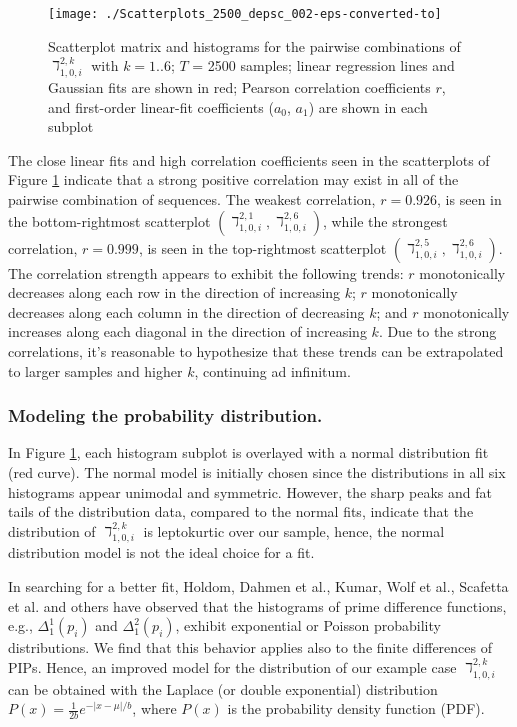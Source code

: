 \documentclass[12pt,longtitle,times]{amsart}
\begin{document}
\begin{figure}[hp]
\centering
\texttt{[image: ./Scatterplots\_2500\_depsc\_002-eps-converted-to]}
\caption{Scatterplot matrix and histograms for the pairwise combinations of $\daleth_{1,0,i}^{2,k}$ with $k=1..6$; $T$ = 2500 samples; linear regression lines and Gaussian fits are shown in red; Pearson correlation coefficients $r$, and first-order linear-fit coefficients ($a_0$, $a_1$) are shown in each subplot}
\label{fig:Scatterplots_BIG_dtiff_001}
\end{figure}

The close linear fits and high correlation coefficients seen in the scatterplots of Figure \ref{fig:Scatterplots_BIG_dtiff_001} indicate that a strong positive correlation may exist in all of the pairwise combination of sequences. The weakest correlation, $r = 0.926$, is seen in the bottom-rightmost scatterplot $(\daleth_{1,0,i}^{2,1},\daleth_{1,0,i}^{2,6})$, while the strongest correlation, $r = 0.999$, is seen in the top-rightmost scatterplot $(\daleth_{1,0,i}^{2,5},\daleth_{1,0,i}^{2,6})$. The correlation strength appears to exhibit the following trends: $r$ monotonically decreases along each row in the direction of increasing $k$; $r$ monotonically decreases along each column in the direction of decreasing $k$; and $r$ monotonically increases along each diagonal in the direction of increasing $k$. Due to the strong correlations, it's reasonable to hypothesize that these trends can be extrapolated to larger samples and higher $k$, continuing ad infinitum.

\subsubsection[short]{Modeling the probability distribution.} In Figure \ref{fig:Scatterplots_BIG_dtiff_001}, each histogram subplot is overlayed with a normal distribution fit (red curve). The normal model is initially chosen since the distributions in all six histograms appear unimodal and symmetric. However, the sharp peaks and fat tails of the distribution data, compared to the normal fits, indicate that the distribution of $\daleth_{1,0,i}^{2,k}$ is leptokurtic over our sample, hence, the normal distribution model is not the ideal choice for a fit. 

In searching for a better fit, Holdom\cite{Holdom-Scale-Invariant-2009}, Dahmen et al.\cite{Dahmen-Similarity-In-The-Statistics-2001}, Kumar\cite{Kumar-Information-Entropy-2003}, Wolf et al.\cite{Wolf1996,Wolf-Nearest_Neighbor-2014}, Scafetta et al.\cite{Scafetta2004} and others\cite{Timberlake-Is-There-Quantum-2008,Selvam-Universal-2014} have observed that the histograms of prime difference functions, e.g., $\Delta_1^1(p_i)$ and $\Delta_1^2(p_i)$, exhibit exponential or Poisson probability distributions. We find that this behavior applies also to the finite differences of PIPs. Hence, an improved model for the distribution of our example case $\daleth_{1,0,i}^{2,k}$ can be obtained with the Laplace (or double exponential) distribution $P(x)=\frac{1}{2b}e^{-|x-\mu|/b}$, where $P(x)$ is the probability density function (PDF). 
\end{document}
